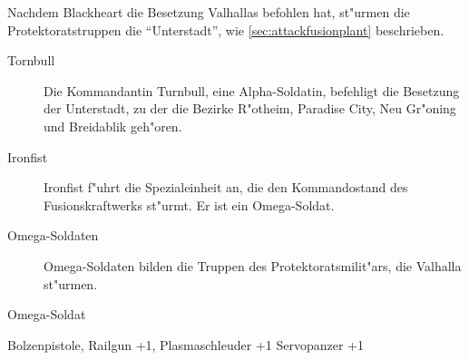 
Nachdem Blackheart die Besetzung Valhallas befohlen hat, st"urmen die Protektoratstruppen die ``Unterstadt'', wie \cref{sec:attackfusionplant} beschrieben.

\begin{description}
    \item[Tornbull] Die Kommandantin Turnbull, eine Alpha-Soldatin, befehligt die Besetzung der Unterstadt, zu der die Bezirke R"otheim, Paradise City, Neu Gr"oning und Breidablik geh"oren.
    \item[Ironfist] Ironfist f"uhrt die Spezialeinheit an, die den Kommandostand des Fusionskraftwerks st"urmt. Er ist ein Omega-Soldat.
    \item[Omega-Soldaten] Omega-Soldaten bilden die Truppen des Protektoratsmilit"ars, die Valhalla st"urmen.
\end{description}

\begin{nscsheet}{Omega-Soldat}
    \nscstats[ATT=3,AGG=2,CON=2]
    \nscruler
    \begin{nscinventory}
        \nscitem[Waffen] Bolzenpistole, Railgun +1, Plasmaschleuder +1
        \nscitem[R"ustung] Servopanzer +1
    \end{nscinventory}
\end{nscsheet}
